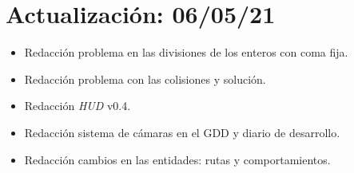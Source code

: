 \section{Actualización: 06/05/21}
\begin{itemize}
	\item Redacción problema en las divisiones de los enteros con coma fija.

	\item Redacción problema con las colisiones y solución.

	\item Redacción \textit{HUD} v0.4.
	
	\item Redacción sistema de cámaras en el GDD y diario de desarrollo.

	\item Redacción cambios en las entidades: rutas y comportamientos.
\end{itemize}
